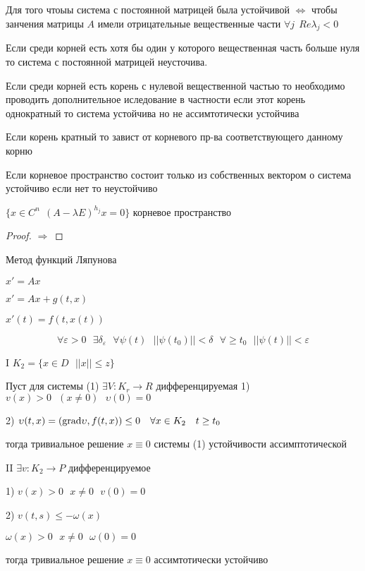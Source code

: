 \begin{block}
  Для того чтоыы система с постоянной матрицей была устойчивой
  $\Leftrightarrow$ чтобы занчения матрицы $A$ имели отрицательные вещественные
  части $\forall j ~~ Re \lambda_j < 0$
\end{block}

\begin{block}
  Если среди корней есть хотя бы один у которого вещественная часть больше нуля
  то система с постоянной матрицей неусточива.
\end{block}

Если среди корней есть корень с нулевой вещественной частью то необходимо
проводить дополнительное иследование в частности если этот корень однократный
то система устойчива но не ассимтотически устойчива

Если корень кратный то завист от корневого пр-ва соответствующего данному корню

Если корневое пространство состоит только из собственных вектором о система
устойчиво если нет то неустойчиво

$\{x \in C^n ~~ (A - \lambda E)^{h_j} x = 0 \}$ корневое пространство

\begin{proof}
  $\Rightarrow$
\end{proof}

\begin{title}[\Large]
  Метод функций Ляпунова
\end{title}

\begin{define}
  $x' = Ax$

  $x' = Ax + g(t,x)$

  $x'(t) = f(t,x(t))$
\end{define}

\begin{define}
  $$
  \forall \varepsilon > 0
  ~~~
  \exists \delta_{\varepsilon}
  ~~~
  \forall \psi(t)
  ~~~
  ||\psi(t_0)|| < \delta
  ~~~
  \forall \ge t_0
  ~~~
  ||\psi(t)|| < \varepsilon
  $$
\end{define}

\begin{theorem}
  I $K_2 = \{x \in D ~~~ ||x|| \le z\}$

  Пуст для системы (1) $\exists V: K_r \to R$ дифференцируемая
  1) $v(x) > 0 ~~~ (x \not= 0) ~~~ \upsilon(0) = 0$

  2) $\upsilon(t,x) = (\mathrm{grad} \upsilon, f(t,x)) \le 0 ~~~ \forall x \in K_2 ~~~
  t \ge t_0$

  тогда тривиальное решение $x \equiv 0$ системы (1) устойчивости
  ассимптотической

  II $\exists v: K_2 \to P$ дифференцируемое

  1) $v(x) > 0 ~~~ x \not= 0 ~~~ v(0) = 0$

  2) $v(t,s) \le - \omega(x)$

  $\omega(x) > 0 ~~~ x \not= 0 ~~~ \omega(0) = 0$

  тогда тривиальное решение $x \equiv 0$ ассимтотически устойчиво
\end{theorem}

